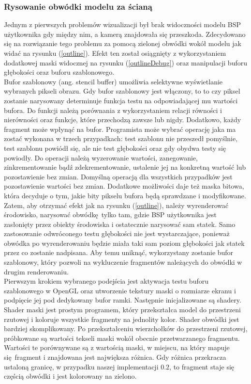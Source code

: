 \subsubsection{Rysowanie obwódki modelu za ścianą}

Jednym z pierwszych problemów wizualizacji był brak widoczności modelu BSP użytkownika gdy między nim, a kamerą znajdowała się przeszkoda. Zdecydowano się na rozwiązanie tego problemu za pomocą zielonej obwódki wokół modelu jak widać na rysunku (\ref{outline}). Efekt ten został osiągnięty z wykorzystaniem dodatkowej maski widocznej na rysunku (\ref{outlineDebug}) oraz manipulacji buforu głębokości oraz buforu szablonowego.
\\

Bufor szablonowy (ang. stencil buffer) umożliwia selektywne wyświetlanie wybranych pikseli obrazu. Gdy bufor szablonowy jest włączony, to to czy piksel zostanie narysowany determinuje funkcja testu na odpowiadającej mu wartości bufora. Do funkcji należą porównania z wykorzystaniem relacji równości i nierówności oraz funkcje, które przechodzą zawsze lub nigdy.
Dodatkowo, każdy fragment może wpłynąć na bufor. Programista może wybrać operację jaka ma zostać wykonana w trzech przypadkach: test szablonu nie przeszedł pomyślnie, test szablonu powiódł się, ale nie test głębokości oraz gdy obydwa testy się powiodły. Do operacji należą wyzerowanie wartości, zanegowanie, zinkrementowanie bądź zdekrementowanie, ustalenie jej na konkretną wartość lub pozostawienie bez zmian. Domyślną operacją dla wszystkich przypadków jest pozostawienie wartości bez zmian. Dodatkowe możliwości daje też maska bitowa, która decyduje o tym, jakie bity pikselu bufora będą sprawdzane i modyfikowane. 
\\

Zatem, aby otrzymać efekt jak na rysunku (\ref{outline}), należy wyrenderować środowisko, narysować obwódkę tylko tam, gdzie BSP użytkownika jest zasłonięty przez obiekty środowiska i ostatecznie narysować sam statek. Samo zastosowanie odwróconego testu głębokości nie jest wystarczające, ponieważ obwódka po wyrenderowaniu będzie miała taki sam poziom głębokości jak statek przez co zostanie nadpisana. Aby temu uniknąć, wykorzystany zostanie bufor szablonowy, który pozwoli na wykluczenie fragmentów należących do obwódki w drugim renderowaniu.
\\

Pierwszym krokiem wybranego podejścia jest aktywacja testu buforu szablonowego w OpenGL oraz utworzenie tekstury maski o rozmiarze ekranu i podpięcie jej pod dedykowany bufor ramki. Następnie inicjalizowane są shadery. Shader maski jest prostym programem, który przekształca model do przestrzeni rzutowej i koloruje wszystkie fragmenty na jednolity kolor. Shader obwódki jest bardziej skomplikowany. Po przekształceniu wierzchołków do przestrzeni rzutowej, próbkowane są wartości tekseli maski wokół obecnie przetwarzanego fragmentu. Wartości te porównywane są z wartością maski, w miejscu, na który mapuje się fragment i znajdowana jest największa różnica. Gdy różnica przekracza ustaloną granicę, w przypadku naszej implementacji $0.2$, to fragment staje się częścią obwódki i jest kolorowany na zielono.
\\

